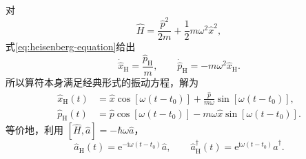\begin{example}[一维谐振子]
对
\begin{equation}
\hat H=\frac{\hat p^2}{2m}+\frac12m\omega^2\hat x^2,
\end{equation}
式\eqref{eq:heisenberg-equation}给出
\begin{equation}
\dot{\hat x}_{\mathrm{H}}=\frac{\hat p_{\mathrm{H}}}{m},
\qquad
\dot{\hat p}_{\mathrm{H}}=-m\omega^2\hat x_{\mathrm{H}}.
\end{equation}
所以算符本身满足经典形式的振动方程，解为
\begin{align}
\hat x_{\mathrm{H}}\left(t\right)
&=\hat x\cos\left[\omega\left(t-t_0\right)\right]
+\frac{\hat p}{m\omega}\sin\left[\omega\left(t-t_0\right)\right],\\
\hat p_{\mathrm{H}}\left(t\right)
&=\hat p\cos\left[\omega\left(t-t_0\right)\right]
-m\omega\hat x\sin\left[\omega\left(t-t_0\right)\right].
\end{align}
等价地，利用 $\left[\hat H,\hat a\right]=-\hbar\omega\hat a$，
\begin{equation}
\hat a_{\mathrm{H}}\left(t\right)=
\mathrm{e}^{-\mathrm{i}\omega\left(t-t_0\right)}\hat a,
\qquad
\hat a_{\mathrm{H}}^\dagger\left(t\right)=
\mathrm{e}^{\mathrm{i}\omega\left(t-t_0\right)}\hat a^\dagger.
\end{equation}
\end{example}

